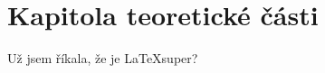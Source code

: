 \chapter{Kapitola teoretické části}
\label{chap:ctc}

Už jsem říkala, že je \LaTeX super?

\lipsum[2-8]